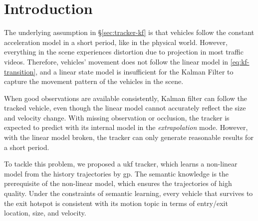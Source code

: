 \section{Introduction}
\label{sec:gp-ukf-intro}

The underlying assumption in \S\ref{sec:tracker-kf} is that vehicles follow the constant acceleration model in a short period, like in the physical world.
However, everything in the scene experiences distortion due to projection in most traffic videos. Therefore, vehicles' movement does not follow the linear model in \ref{eq:kf-transition}, and a linear state model is insufficient for the Kalman Filter to capture the movement pattern of the vehicles in the scene.

When good observations are available consistently, Kalman filter can follow the tracked vehicle, even though the linear model cannot accurately reflect the size and velocity change. 
With missing observation or occlusion, the tracker is expected to predict with its internal model in the \emph{extrapolation} mode. 
However, with the linear model broken, the tracker can only generate reasonable results for a short period.

To tackle this problem, we proposed a \gls{ukf} tracker, which learns a non-linear model from the history trajectories by \gls{gp}. 
The semantic knowledge is the prerequisite of the non-linear model, which ensures the trajectories of high quality.
Under the constraints of semantic learning, every vehicle that survives to the exit hotspot is consistent with its motion topic in terms of entry/exit location, size, and velocity.
